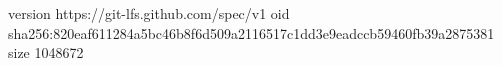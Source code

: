 version https://git-lfs.github.com/spec/v1
oid sha256:820eaf611284a5bc46b8f6d509a2116517c1dd3e9eadccb59460fb39a2875381
size 1048672
